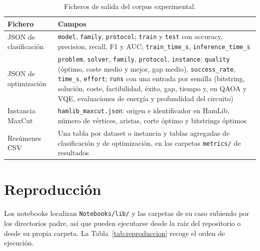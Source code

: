 \begin{table}[!htbp]
\centering
\footnotesize
\setlength{\tabcolsep}{4pt}
\renewcommand{\arraystretch}{1.15}
\begin{tabularx}{\linewidth}{@{}>{\raggedright\arraybackslash}p{3.6cm} >{\raggedright\arraybackslash}X@{}}
\toprule
\textbf{Fichero} & \textbf{Campos} \\
\midrule
JSON de clasificación & \texttt{model}, \texttt{family}, \texttt{protocol}; \texttt{train} y \texttt{test} con accuracy, precision, recall, F1 y AUC; \texttt{train\_time\_s}, \texttt{inference\_time\_s} \\
JSON de optimización & \texttt{problem}, \texttt{solver}, \texttt{family}, \texttt{protocol}, \texttt{instance}; \texttt{quality} (óptimo, coste medio y mejor, gap medio), \texttt{success\_rate}, \texttt{time\_s}, \texttt{effort}; \texttt{runs} con una entrada por semilla (bitstring, solución, coste, factibilidad, éxito, gap, tiempo y, en QAOA y VQE, evaluaciones de energía y profundidad del circuito) \\
Instancia MaxCut & \texttt{hamlib\_maxcut.json}: origen e identificador en HamLib, número de vértices, aristas, corte óptimo y bitstrings óptimos \\
Resúmenes CSV & Una tabla por dataset o instancia y tablas agregadas de clasificación y de optimización, en las carpetas \texttt{metrics/} de resultados \\
\bottomrule
\end{tabularx}
\caption{Ficheros de salida del corpus experimental.}
\label{tab:salidas}
\end{table}

\section{Reproducción}
\label{anx:reproduccion}

Los notebooks localizan \texttt{Notebooks/lib/} y las carpetas de su caso subiendo por los directorios padre, así que pueden ejecutarse desde la raíz del repositorio o desde su propia carpeta. La Tabla~\ref{tab:reproduccion} recoge el orden de ejecución.


